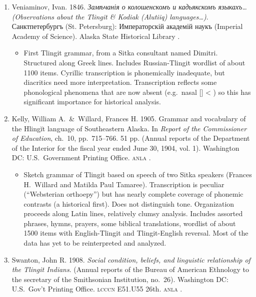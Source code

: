 \documentclass[12pt,letterpaper,oneside,article]{memoir}
\begin{document}
\begin{enumerate}
\item	Veniaminov, Ivan.
	1846.
	\textit{Замѣ\-ча\-нія о кол\-ош\-ен\-скомъ и кадь\-як\-скомъ язык\-ахъ…
		(Observations about the Tlingit \& Kodiak (Alutiiq) languages…)}.
	Санкт\-петер\-бургъ (St. Petersburg):
	Им\-пер\-а\-тор\-скій ака\-д\-емій на\-укъ (Imperial Academy of Science).
	Alaska State Historical Library .
	\begin{itemize}
	\item	First Tlingit grammar, from a Sitka consultant named Dimitri.
		Structured along Greek lines.
		Includes Russian-Tlingit wordlist of about 1100 items.
		Cyrillic transcription is phonemically inadequate, but diacritics
		need more interpretation.
		Transcription reflects some phonological phenomena that are now absent
		(e.g.\ nasal  [] < ) so this has significant
		importance for historical analysis.
	\end{itemize}
\item	Kelly, William A.\ \&\ Willard, Frances H.
	1905.
	Grammar and vocabulary of the Hlingĭt language of Southeastern Alaska.
	In \textit{Report of the Commissioner of Education}, ch.\ 10, pp.\ 715–766.
	51 pp.
	(Annual reports of the Department of the Interior for the fiscal year ended
		June 30, 1904, vol. 1).
	Washington DC: U.S.\ Government Printing Office.
	\textsc{anla} .
	\begin{itemize}
	\item	Sketch grammar of Tlingit based on speech of two Sitka speakers
		(Frances H.\ Willard and Matilda Paul Tamaree).
		Transcription is peculiar (“Websterian orthoepy”) but has nearly complete
		coverage of phonemic contrasts (a historical first).
		Does not distinguish tone.
		Organization proceeds along Latin lines, relatively clumsy analysis.
		Includes assorted phrases, hymns, prayers, some biblical translations,
		wordlist of about 1500 items with English-Tlingit and Tlingit-English reversal.
		Most of the data has yet to be reinterpreted and analyzed.
	\end{itemize}
\item	Swanton, John R.
	1908.
	\textit{Social condition, beliefs, and linguistic relationship of the Tlingit Indians}.
	(Annual reports of the Bureau of American Ethnology to the secretary of the
		Smithsonian Institution, no.\ 26).
	Washington DC: U.S.\ Gov’t Printing Office.
	\textsc{lcccn} E51.U55 26th.
	\textsc{anla} .

\end{enumerate}
\end{document}
